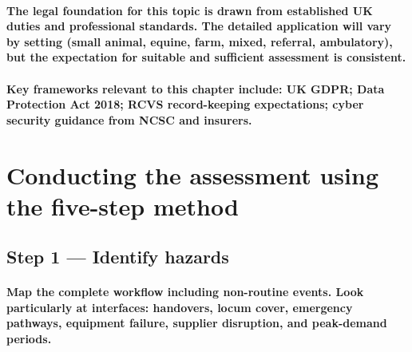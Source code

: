 \paragraph{The legal foundation for this topic is drawn from established UK duties and professional standards. The detailed application will vary by setting (small animal, equine, farm, mixed, referral, ambulatory), but the expectation for suitable and sufficient assessment is consistent.}

\paragraph{Key frameworks relevant to this chapter include: UK GDPR; Data Protection Act 2018; RCVS record-keeping expectations; cyber security guidance from NCSC and insurers.}

\begin{itemize}
\end{itemize}

\section{Conducting the assessment using the five-step method}

\subsection{Step 1 — Identify hazards}
\paragraph{Map the complete workflow including non-routine events. Look particularly at interfaces: handovers, locum cover, emergency pathways, equipment failure, supplier disruption, and peak-demand periods.}

